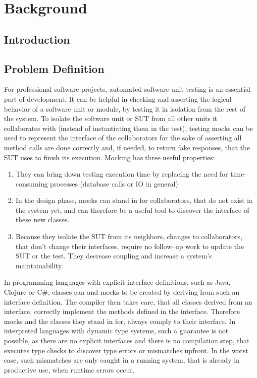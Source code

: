 \chapter{Background}

\section{Introduction}

\section{Problem Definition}
For professional software projects, automated software unit testing is an essential part of development. It can be helpful in checking and asserting the logical behavior of a software unit or module, by testing it in isolation from the rest of the system. To isolate the software unit or \ac{SUT} from all other units it collaborates with (instead of instantiating them in the test), testing mocks can be used to represent the interface of the collaborators for the sake of asserting all method calls are done correctly and, if needed, to return fake responses, that the \ac{SUT} uses to finish its execution. Mocking has three useful properties:

\begin{enumerate}
\item They can bring down testing execution time by replacing the need for time–consuming processes (\eg database calls or IO in general)
\item In the design phase, mocks can stand in for collaborators, that do not exist in the system yet, and can therefore be a useful tool to discover the interface of these new classes.
\item Because they isolate the \ac{SUT} from its neighbors, changes to collaborators, that don't change their interfaces, require no follow–up work to update the \ac{SUT} or the test. They decrease coupling and increase a system's maintainability.
\end{enumerate}

In programming languages with explicit interface definitions, such as Java, Clojure or C\#, classes can and mocks to be created by deriving from such an interface definition. The compiler then takes care, that all classes derived from an interface, correctly implement the methods defined in the interface. Therefore mocks and the classes they stand in for, always comply to their interface. In interpreted languages with dynamic type systems, such a guarantee is not possible, as there are no explicit interfaces and there is no compilation step, that executes type checks to discover type errors or mismatches upfront. In the worst case, such mismatches are only caught in a running system, that is already in productive use, when runtime errors occur.

